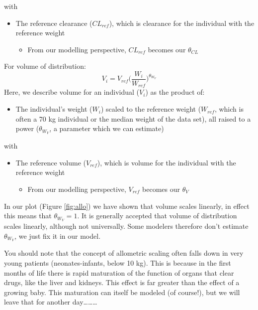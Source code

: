 \documentclass[
]{article}
\providecommand{\tightlist}{%
  \setlength{\itemsep}{0pt}\setlength{\parskip}{0pt}}
\begin{document}
with

\begin{itemize}
\tightlist
\item
  The reference clearance (\(CL_{ref}\)), which is clearance for the individual with the reference weight

  \begin{itemize}
  \tightlist
  \item
    From our modelling perspective, \(CL_{ref}\) becomes our \(\theta_{CL}\)
  \end{itemize}
\end{itemize}

For volume of distribution: \[V_i=V_{ref}\bigg( \frac{W_i}{W_{ref}} \bigg) ^ {\theta_{W_{V}}} \] Here, we describe volume for an individual (\(V_i\)) as the product of:

\begin{itemize}
\tightlist
\item
  The individual's weight (\(W_i\)) scaled to the reference weight (\(W_{ref}\), which is often a 70 kg individual or the median weight of the data set), all raised to a power (\({\theta_{W_{V}}}\), a parameter which we can estimate)
\end{itemize}

with

\begin{itemize}
\tightlist
\item
  The reference volume (\(V_{ref}\)), which is volume for the individual with the reference weight

  \begin{itemize}
  \tightlist
  \item
    From our modelling perspective, \(V_{ref}\) becomes our \(\theta_{V}\)
  \end{itemize}
\end{itemize}

In our plot (Figure \ref{fig:allo}) we have shown that volume scales linearly, in effect this means that \(\theta_{W_{V}}=1\). It is generally accepted that volume of distribution scales linearly, although not universally. Some modelers therefore don't estimate \(\theta_{W_{V}}\), we just fix it in our model.

You should note that the concept of allometric scaling often falls down in very young patients (neonates-infants, below 10 kg). This is because in the first months of life there is rapid maturation of the function of organs that clear drugs, like the liver and kidneys. This effect is far greater than the effect of a growing baby. This maturation can itself be modeled (of course!), but we will leave that for another day\ldots\ldots\ldots{}
\end{document}

